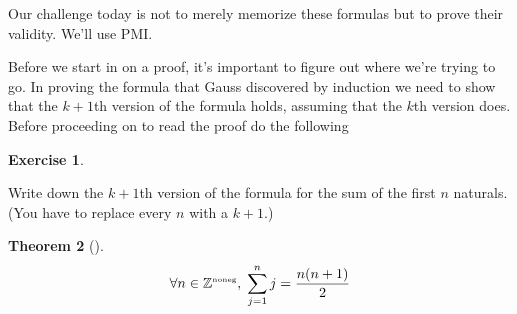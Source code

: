 \documentclass[10pt,]{book}
\theoremstyle{plain}
\newtheorem{theorem}{Theorem}[section]
\theoremstyle{definition}
\theoremstyle{definition}
\newtheorem{exercise}[theorem]{Exercise}
\numberwithin{equation}{section}
\renewcommand{\Naturals}{{\mathbb Z}^{\mbox{\tiny noneg}} }
\newcommand{\Naturals}{{\mathbb N}}
\begin{document}
    Our challenge today is not to merely memorize these formulas but
    to prove their validity. We'll use PMI.
\par

    Before we start in on a proof, it's important to figure out where
    we're trying to go. In proving the formula that Gauss discovered
    by induction we need to show that the \(k+1\)\textendash{}th version of the
    formula holds, assuming that the \(k\)\textendash{}th version does. Before
    proceeding on to read the proof do the following
\begin{exercise}\label{exercise-44}

        Write down the \(k+1\)\textendash{}th version of the formula for the sum of
        the first \(n\) naturals. (You have to replace every \(n\) with
        a \(k+1\).)
\end{exercise}
\begin{theorem}[{}]\label{theorem-16}
\begin{equation*}
        \forall n \in \Naturals, \; \sum_{j=1}^n j = \frac{n(n+1)}{2}
      \end{equation*}\end{theorem}
\end{document}
